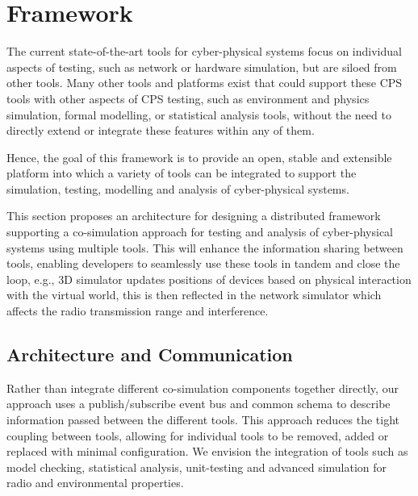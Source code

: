 


\chapter{Framework}
\label{sec:framework}
The current state-of-the-art tools for cyber-physical systems focus on individual aspects of testing, such as network or hardware simulation, but are siloed from other tools. Many other tools and platforms exist that could support these CPS tools with other aspects of CPS testing, such as environment and physics simulation, formal modelling, or statistical analysis tools, without the need to directly extend or integrate these features within any of them. 

Hence, the goal of this framework is to provide an open, stable and extensible platform into which a variety of tools can be integrated to support the simulation, testing, modelling and analysis of cyber-physical systems.

This section proposes an architecture for designing a distributed framework supporting a co-simulation approach for testing and analysis of cyber-physical systems using multiple tools.
This will enhance the information sharing between tools, enabling developers to seamlessly use these tools in tandem and close the loop, e.g., 3D simulator updates positions of devices based on physical interaction with the virtual world, this is then reflected in the network simulator which affects the radio transmission range and interference.

\section{Architecture and Communication} %
\label{sub:architecture}
Rather than integrate different co-simulation components together directly, our approach uses a publish/subscribe event bus and common schema to describe information passed between the different tools. This approach reduces the tight coupling between tools, allowing for individual tools to be removed, added or replaced with minimal configuration. We envision the integration of tools such as model checking, statistical analysis, unit-testing and advanced simulation for radio and environmental properties.

